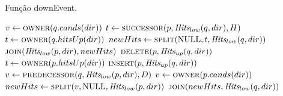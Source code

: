 \begin{algorithm}
    \caption{Função downEvent.} \label{par:eventodown}
\begin{algorithmic}[1]
            \State $v \leftarrow \Call{owner}{q.cands(dir)}$
                \State {}
            \EndIf
            \State {}
            \State $t \leftarrow \Call{successor}{p, \Hits_{low}(q, dir), H}$
                \State $t \leftarrow \Call{owner}{q.hitsUp(dir)}$
            \EndIf
            \State $newHits \leftarrow \Call{split}{\Null, t, \Hits_{low}(q, dir)}$
            \State $\Call{join}{\Hits_{low}(p, dir), newHits}$
            \State $\Call{delete}{p, \Hits_{up}(q, dir)}$
                \State {}
            \EndIf
        \Else
                \State $t \leftarrow \Call{owner}{p.hitsUp(dir)}$
                    \State {}
                \EndIf
                \State $\Call{insert}{p, \Hits_{up}(q, dir)}$
                \State $v \leftarrow \Call{predecessor}{q, \Hits_{low}(p, dir), D}$
                    \State $v \leftarrow \Call{owner}{p.cands(dir)}$
                \EndIf
                \State $newHits \leftarrow \Call{split}{v, \Null, \Hits_{low}(p,dir)}$
                \State $\Call{join}{newHits, \Hits_{low}(q, dir)}$
                \State {}
                    \State {}
                \EndIf
            \EndIf
        \EndIf
    \EndFunction
\end{algorithmic}
\end{algorithm}